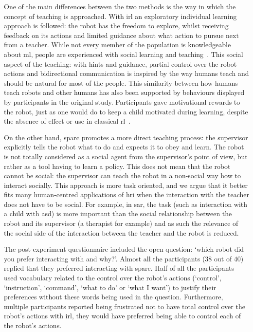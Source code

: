 One of the main differences between the two methods is the way in which the concept of teaching is approached. With \gls{irl} an exploratory individual learning approach is followed: the robot has the freedom to explore, whilst receiving feedback on its actions and limited guidance about what action to pursue next from a teacher. While not every member of the population is knowledgeable about \gls{ml}, people are experienced with social learning and teaching~\citep{thomaz2008teachable}. This social aspect of the teaching: with hints and guidance, partial control over the robot actions and bidirectional communication is inspired by the way humans teach and should be natural for most of the people. This similarity between how humans teach robots and other humans has also been supported by behaviours displayed by participants in the original study. Participants gave motivational rewards to the robot, just as one would do to keep a child motivated during learning, despite the absence of effect or use in classical \gls{rl}~\citep{thomaz2008teachable}.

On the other hand, \gls{sparc} promotes a more direct teaching process: the supervisor explicitly tells the robot what to do and expects it to obey and learn. The robot is not totally considered as a social agent from the supervisor's point of view, but rather as a tool having to learn a policy. This does not mean that the robot cannot be social: the supervisor can teach the robot in a non-social way how to interact socially. This approach is more task oriented, and we argue that it better fits many human-centred applications of \gls{hri} when the interaction with the teacher does not have to be social. For example, in \gls{sar}, the task (such as interaction with a child with \gls{asd}) is more important than the social relationship between the robot and its supervisor (a therapist for example) and as such the relevance of the social side of the interaction between the teacher and the robot is reduced.

The post-experiment questionnaire included the open question: `which robot did you prefer interacting with and why?'. Almost all the participants (38 out of 40) replied that they preferred interacting with \gls{sparc}. Half of all the participants used vocabulary related to the control over the robot's actions (`control', `instruction', `command', `what to do' or `what I want') to justify their preferences without these words being used in the question. Furthermore, multiple participants reported being frustrated not to have total control over the robot's actions with \gls{irl}, they would have preferred being able to control each of the robot's actions. 

